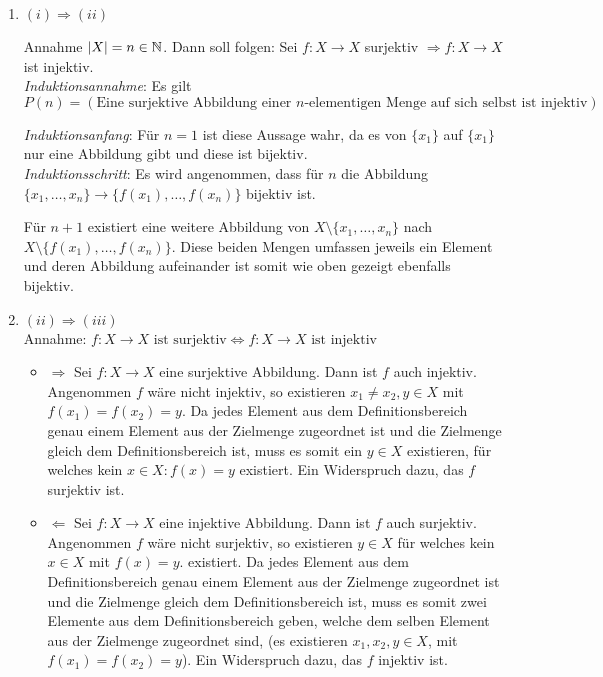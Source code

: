 \documentclass{article}
\begin{document}
\begin{enumerate}[(1)]
\item $(i) \Rightarrow (ii)$
  
  Annahme $\abs{X} = n \in \mathbb{N}$. Dann soll folgen: Sei $f \colon X \to X$ surjektiv
  $\Rightarrow f \colon X \to X$ ist injektiv. \\

  \emph{Induktionsannahme}: Es gilt
  \[
    P(n) = (\text{Eine surjektive Abbildung einer $n$-elementigen Menge auf sich selbst ist injektiv})
  \]

  \emph{Induktionsanfang}: Für $n = 1$ ist diese Aussage wahr, da es von $\{ x_1 \}$ auf $\{ x_1 \}$ nur eine Abbildung gibt und diese ist bijektiv. \\

  \emph{Induktionsschritt}: Es wird angenommen, dass für $n$ die Abbildung $\{ x_1, \ldots, x_n \} \to \{ f(x_1), \ldots, f(x_n) \}$
  bijektiv ist.
  
  Für $n + 1$ existiert eine weitere Abbildung von
  $X \setminus \{ x_1, \ldots, x_n \}$ nach $X \setminus \{ f(x_1), \ldots, f(x_n) \}$. 
  Diese beiden Mengen umfassen jeweils ein Element und deren Abbildung aufeinander ist somit wie oben gezeigt ebenfalls bijektiv.
  
\item $(ii) \Rightarrow (iii)$ \\

  Annahme: $f \colon X \to X \text{ ist surjektiv} \iff f \colon X \to X \text{ ist injektiv}$
  \begin{itemize}
  \item $\Rightarrow$
    Sei $f \colon X \to X$ eine surjektive Abbildung. Dann ist $f$ auch injektiv. \\

    Angenommen $f$ wäre nicht injektiv, so existieren $x_1 \ne x_2, y \in X$ mit $f(x_1) = f(x_2) = y$.
    Da jedes Element aus dem Definitionsbereich genau einem Element aus der Zielmenge zugeordnet ist und
    die Zielmenge gleich dem Definitionsbereich ist, muss es somit ein $y \in X$ existieren, für welches
    kein $x \in X \colon f(x) = y$ existiert.
    Ein Widerspruch dazu, das $f$ surjektiv ist.
  \item $\Leftarrow$
    Sei $f \colon X \to X$ eine injektive Abbildung. Dann ist $f$ auch surjektiv. \\

    Angenommen $f$ wäre nicht surjektiv, so existieren $y \in X$ für welches kein $x \in X$ mit $f(x) = y$.
    existiert.
    Da jedes Element aus dem Definitionsbereich genau einem Element aus der Zielmenge zugeordnet ist und
    die Zielmenge gleich dem Definitionsbereich ist, muss es somit zwei Elemente aus dem Definitionsbereich geben,
    welche dem selben Element aus der Zielmenge zugeordnet sind, (es existieren $x_1, x_2, y \in X$, mit
    $f(x_1) = f(x_2) = y$).
    Ein Widerspruch dazu, das $f$ injektiv ist.    
  \end{itemize}
  

\end{enumerate}
\end{document}
